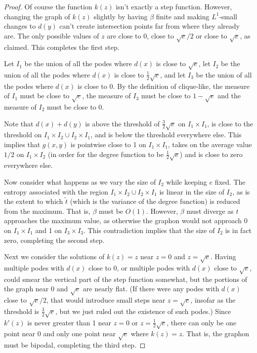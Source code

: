 \documentclass[12pt]{amsart}
\newcommand{\1}{\mathbf{1}}
\begin{document}
\begin{proof}
Of course the function $k(z)$ isn't exactly a step function. However, changing the 
graph of $k(z)$ slightly by having $\beta$ finite and 
making $L^1$-small changes to $d(y)$ can't create intersection points far from where they already are. The only possible values
of $z$ are close to 0, close to $\sqrt{e}/2$ or close to $\sqrt{e}$, as claimed. This completes the first step. 

Let $I_1$ be the union of all the podes where $d(x)$ is close to $\sqrt{e}$, let $I_2$ be the union of all the podes 
where $d(x)$ is close to $\frac12 \sqrt{e}$, and let $I_3$ be the union of all the podes where $d(x)$ is close to 0. By the definition of clique-like, the measure of $I_1$ must be 
close to $\sqrt{e}$, the measure of $I_3$ must be close to $1-\sqrt{e}$ and the measure of 
$I_2$ must be close to 0. 

Note that $d(x)+d(y)$ is above the threshold of $\frac32 \sqrt{e}$ on $I_1 \times I_1$, is close to the threshold on 
$I_1 \times I_2 \cup I_2 \times I_1$, and is below the threshold everywhere else. This implies that $g(x,y)$ is pointwise close to 1 on $I_1 \times I_1$, takes on the average value 
$1/2$ on $I_1 \times I_2$ (in order for the degree function to be $\frac12 \sqrt{e}$) and is
close to zero everywhere else.

Now consider what happens as we vary the size of $I_2$ while keeping $e$ fixed. The entropy associated with the region 
$I_1 \times I_2 \cup I_2 \times I_1$ is linear in the size of $I_2$, as is the extent to which $\tilde t$ (which is the 
variance of the degree function) is reduced from the maximum. That is, $\beta$ must be $O(1)$. However, $\beta$ must diverge as $t$ approaches
the maximum value, as otherwise the graphon would not approach 0 on $I_1\times I_1$ and
1 on $I_3 \times I_3$. This contradiction implies that the size of $I_2$ is in fact zero,
completing the second step.

Next we consider the solutions of $k(z) = z$ near $z=0$ and $z=\sqrt{e}$. Having multiple podes with $d(x)$ close to 0, 
or multiple podes with $d(x)$ close to $\sqrt{e}$, could smear the vertical part of the step function somewhat, but the 
portions of the graph near 0 and $\sqrt{e}$ are nearly flat. (If there were any podes with $d(x)$ close to $\sqrt{e}/2$, 
that would introduce small steps near $z=\sqrt{e}$, insofar as the threshold is $\frac32 \sqrt{e}$, but we just ruled out
the existence of such podes.) Since $k'(z)$ is never greater than 1 near $z=0$ or $z=\frac12 \sqrt{e}$, there can only be one
point near 0 and only one point near $\sqrt{e}$ where $k(z)=z$. 
That is, the graphon must be bipodal, completing the third step.


\end{proof}
\end{document}

